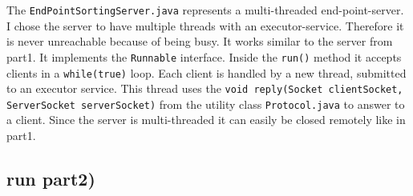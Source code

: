 \documentclass{article}
\begin{document}
    The \texttt{EndPointSortingServer.java} represents a multi-threaded end-point-server. I chose the server to have multiple threads with an executor-service. Therefore it is never unreachable because of being busy. It works similar to the server from part1. It implements the \texttt{Runnable} interface. Inside the \texttt{run()} method it accepts clients in a \texttt{while(true)} loop. Each client is handled by a new thread, submitted to an executor service. This thread uses the \texttt{void reply(Socket clientSocket, ServerSocket serverSocket)} from the utility class \texttt{Protocol.java} to answer to a client. Since the server is multi-threaded it can easily be closed remotely like in part1. 
    
    \subsection*{run part2)}
      
\end{document}
